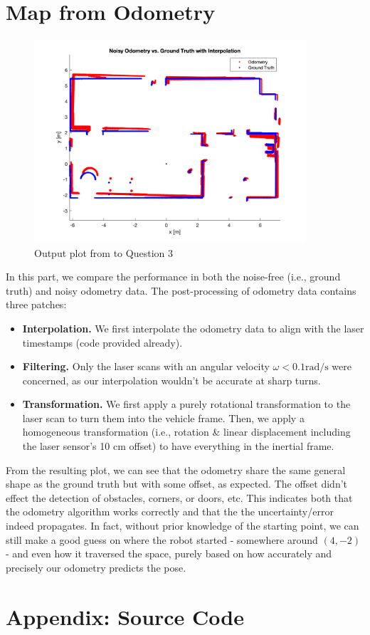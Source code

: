 \documentclass{article} %
\begin{document}
\section{Map from  Odometry} %
\begin{figure}[hbt]
  \centering
    \includegraphics[width=0.9\textwidth]{ass1_q3.png}
  \caption{Output plot from to Question 3}
\end{figure}

In this part, we compare the performance in both the noise-free (i.e., ground truth) and noisy odometry data. The post-processing of odometry data contains three patches:
\begin{itemize}
    \item \textbf{Interpolation.} We first interpolate the odometry data to align with the laser timestamps (code provided already).
    \item \textbf{Filtering.} Only the laser scans with an angular velocity $\omega<0.1\textrm{rad/s}$ were concerned, as our interpolation wouldn't be accurate at sharp turns.
    \item \textbf{Transformation.} We first apply a purely rotational transformation to the laser scan to turn them into the vehicle frame. Then, we apply a homogeneous transformation (i.e., rotation \& linear displacement including the laser sensor's 10 cm offset) to have everything in the inertial frame.
\end{itemize}

From the resulting plot, we can see that the odometry share the same general shape as the ground truth but with some offset, as expected. The offset didn't effect the detection of obstacles, corners, or doors, etc. This indicates both that the odometry algorithm works correctly and that the the uncertainty/error indeed propagates. In fact, without prior knowledge of the starting point, we can still make a good guess on where the robot started - somewhere around $(4, -2)$ - and even how it traversed the space, purely based on how accurately and precisely our odometry predicts the pose.

\clearpage
\section*{Appendix: Source Code}

\end{document}
